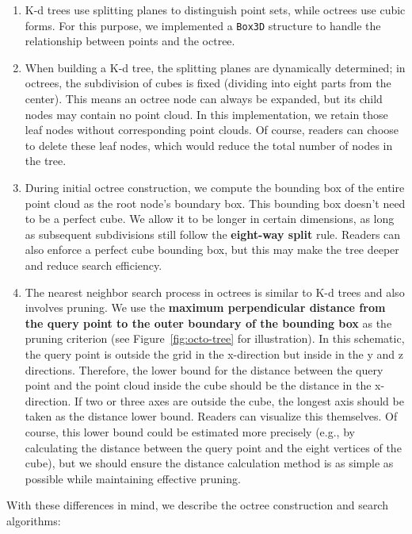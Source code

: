 \begin{enumerate}
	\item K-d trees use splitting planes to distinguish point sets, while octrees use cubic forms. For this purpose, we implemented a \texttt{Box3D} structure to handle the relationship between points and the octree.
	\item When building a K-d tree, the splitting planes are dynamically determined; in octrees, the subdivision of cubes is fixed (dividing into eight parts from the center). This means an octree node can always be expanded, but its child nodes may contain no point cloud. In this implementation, we retain those leaf nodes without corresponding point clouds. Of course, readers can choose to delete these leaf nodes, which would reduce the total number of nodes in the tree.
	\item During initial octree construction, we compute the bounding box of the entire point cloud as the root node's boundary box. This bounding box doesn't need to be a perfect cube. We allow it to be longer in certain dimensions, as long as subsequent subdivisions still follow the \textbf{eight-way split} rule. Readers can also enforce a perfect cube bounding box, but this may make the tree deeper and reduce search efficiency.
	\item The nearest neighbor search process in octrees is similar to K-d trees and also involves pruning. We use the \textbf{maximum perpendicular distance from the query point to the outer boundary of the bounding box} as the pruning criterion (see Figure~\ref{fig:octo-tree} for illustration). In this schematic, the query point is outside the grid in the x-direction but inside in the y and z directions. Therefore, the lower bound for the distance between the query point and the point cloud inside the cube should be the distance in the x-direction. If two or three axes are outside the cube, the longest axis should be taken as the distance lower bound. Readers can visualize this themselves. Of course, this lower bound could be estimated more precisely (e.g., by calculating the distance between the query point and the eight vertices of the cube), but we should ensure the distance calculation method is as simple as possible while maintaining effective pruning.
\end{enumerate}

With these differences in mind, we describe the octree construction and search algorithms:

